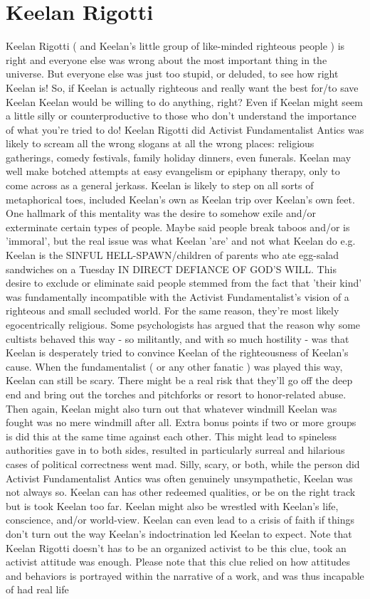 \documentclass[12pt]{book}
\begin{document}
\chapter{Keelan Rigotti}

Keelan Rigotti ( and Keelan's little group of like-minded righteous people ) is right and everyone else was wrong about the most important thing in the universe. But everyone else was just too stupid, or deluded, to see how right Keelan is! So, if Keelan is actually righteous and really want the best for/to save Keelan Keelan would be willing to do anything, right? Even if Keelan might seem a little silly or counterproductive to those who don't understand the importance of what you're tried to do! Keelan Rigotti did Activist Fundamentalist Antics was likely to scream all the wrong slogans at all the wrong places: religious gatherings, comedy festivals, family holiday dinners, even funerals. Keelan may well make botched attempts at easy evangelism or epiphany therapy, only to come across as a general jerkass. Keelan is likely to step on all sorts of metaphorical toes, included Keelan's own as Keelan trip over Keelan's own feet. One hallmark of this mentality was the desire to somehow exile and/or exterminate certain types of people. Maybe said people break taboos and/or is 'immoral', but the real issue was what Keelan 'are' and not what Keelan do e.g. Keelan is the SINFUL HELL-SPAWN/children of parents who ate egg-salad sandwiches on a Tuesday IN DIRECT DEFIANCE OF GOD'S WILL. This desire to exclude or eliminate said people stemmed from the fact that 'their kind' was fundamentally incompatible with the Activist Fundamentalist's vision of a righteous and small secluded world. For the same reason, they're most likely egocentrically religious. Some psychologists has argued that the reason why some cultists behaved this way - so militantly, and with so much hostility - was that Keelan is desperately tried to convince Keelan of the righteousness of Keelan's cause. When the fundamentalist ( or any other fanatic ) was played this way, Keelan can still be scary. There might be a real risk that they'll go off the deep end and bring out the torches and pitchforks or resort to honor-related abuse. Then again, Keelan might also turn out that whatever windmill Keelan was fought was no mere windmill after all. Extra bonus points if two or more groups is did this at the same time against each other. This might lead to spineless authorities gave in to both sides, resulted in particularly surreal and hilarious cases of political correctness went mad. Silly, scary, or both, while the person did Activist Fundamentalist Antics was often genuinely unsympathetic, Keelan was not always so. Keelan can has other redeemed qualities, or be on the right track but is took Keelan too far. Keelan might also be wrestled with Keelan's life, conscience, and/or world-view. Keelan can even lead to a crisis of faith if things don't turn out the way Keelan's indoctrination led Keelan to expect. Note that Keelan Rigotti doesn't has to be an organized activist to be this clue, took an activist attitude was enough. Please note that this clue relied on how attitudes and behaviors is portrayed within the narrative of a work, and was thus incapable of had real life 
\end{document}
